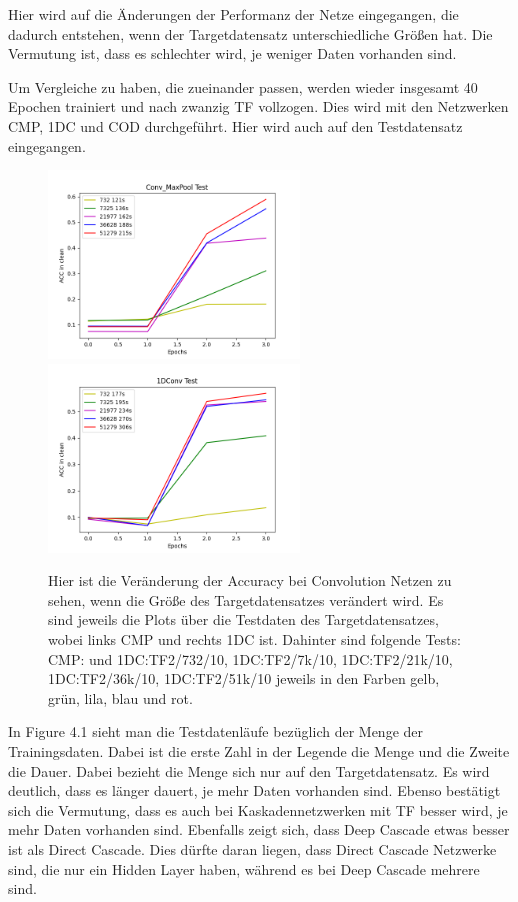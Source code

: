Hier wird auf die Änderungen der Performanz der Netze eingegangen, die dadurch entstehen, wenn der Targetdatensatz unterschiedliche Größen hat. 
Die Vermutung ist, dass es schlechter wird, je weniger Daten vorhanden sind. 

Um Vergleiche zu haben, die zueinander passen, werden wieder insgesamt 40 Epochen trainiert und nach zwanzig TF vollzogen. Dies wird mit den 
Netzwerken 
CMP, 1DC und COD durchgeführt. Hier wird auch auf den Testdatensatz eingegangen. 

\begin{figure}[htpb]
    \includegraphics[height=5cm]{../../Plots/ba_plots/targetgroesse/cmp_ts.png}
    \includegraphics[height=5cm]{../../Plots/ba_plots/targetgroesse/1dc_ts.png}
    \caption{\label{fig:targetgroessedeepdir} 
    \small{Hier ist die Veränderung der Accuracy bei Convolution Netzen zu sehen, wenn die Größe des Targetdatensatzes verändert wird. 
    Es sind jeweils die Plots über die Testdaten des Targetdatensatzes, wobei links CMP und rechts 1DC ist. 
    Dahinter sind folgende Tests: CMP: und 
    1DC:TF2/732/10, 1DC:TF2/7k/10, 1DC:TF2/21k/10, 1DC:TF2/36k/10, 1DC:TF2/51k/10 jeweils in den Farben gelb, grün, lila, blau und rot. 
    }}
\end{figure}

In Figure 4.1 sieht man die Testdatenläufe bezüglich der Menge der Trainingsdaten. Dabei ist die erste Zahl in der Legende die Menge und die 
Zweite die Dauer. Dabei bezieht die Menge sich nur auf den Targetdatensatz. Es wird deutlich, dass es länger dauert, je mehr Daten vorhanden sind. 
Ebenso bestätigt sich die Vermutung, dass es auch bei Kaskadennetzwerken mit TF besser wird, je mehr Daten vorhanden sind. 
Ebenfalls zeigt sich, dass Deep Cascade etwas besser ist als Direct Cascade. Dies dürfte daran liegen, dass Direct Cascade Netzwerke sind, 
die nur ein Hidden Layer haben, während es bei Deep Cascade mehrere sind. 

